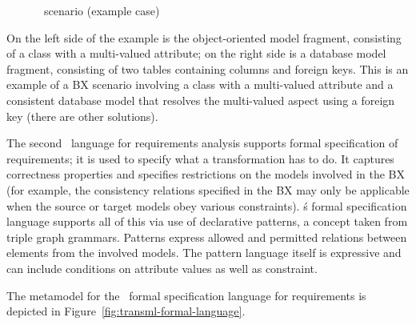 \begin{figure}[htbp]
\caption{\transml\ scenario (example case)}
\label{fig:transml-example-case}
\end{figure}

On the left side of the example is the object-oriented model fragment, consisting of a class with a multi-valued attribute; on the right side is a database model fragment, consisting of two tables containing columns and foreign keys. This is an example of a BX scenario involving a class with a multi-valued attribute and a consistent database model that resolves the multi-valued aspect using a foreign key (there are other solutions).

The second \transml\ language for requirements analysis supports formal specification of requirements; it is used to specify what a transformation has to do. It captures correctness properties and specifies restrictions on the models involved in the BX (for example, the consistency relations specified in the BX may only be applicable when the source or target models obey various constraints). \transml\'s formal specification language supports all of this via use of declarative patterns, a concept taken from triple graph grammars. Patterns express allowed and permitted relations between elements from the involved models. The pattern language itself is expressive and can include conditions on attribute values as well as constraint.

The metamodel for the \transml\ formal specification language for requirements is depicted in Figure~\ref{fig:transml-formal-language}.

